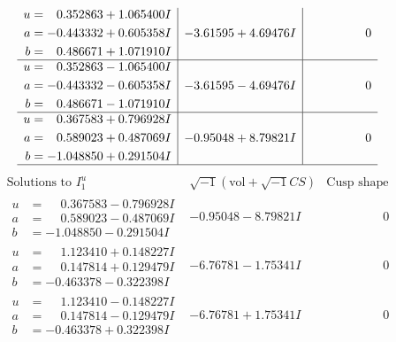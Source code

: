 \documentclass[1p]{elsarticle_modified}
\theoremstyle{definition}
\newcommand{\I}{\sqrt{-1}}
\begin{document}
$$\begin{array}{c|c|c}
\begin{aligned}
u &= \phantom{-}0.352863 + 1.065400 I \\
a &= -0.443332 + 0.605358 I \\
b &= \phantom{-}0.486671 + 1.071910 I\end{aligned}
 & -3.61595 + 4.69476 I & \phantom{-0.000000 } 0 \\ \hline\begin{aligned}
u &= \phantom{-}0.352863 - 1.065400 I \\
a &= -0.443332 - 0.605358 I \\
b &= \phantom{-}0.486671 - 1.071910 I\end{aligned}
 & -3.61595 - 4.69476 I & \phantom{-0.000000 } 0 \\ \hline\begin{aligned}
u &= \phantom{-}0.367583 + 0.796928 I \\
a &= \phantom{-}0.589023 + 0.487069 I \\
b &= -1.048850 + 0.291504 I\end{aligned}
 & -0.95048 + 8.79821 I & \phantom{-0.000000 } 0\\
 \hline 
 \end{array}$$\newpage$$\begin{array}{c|c|c}  
\text{Solutions to }I^u_{1}& \I (\text{vol} + \sqrt{-1}CS) & \text{Cusp shape}\\
 \hline 
\begin{aligned}
u &= \phantom{-}0.367583 - 0.796928 I \\
a &= \phantom{-}0.589023 - 0.487069 I \\
b &= -1.048850 - 0.291504 I\end{aligned}
 & -0.95048 - 8.79821 I & \phantom{-0.000000 } 0 \\ \hline\begin{aligned}
u &= \phantom{-}1.123410 + 0.148227 I \\
a &= \phantom{-}0.147814 + 0.129479 I \\
b &= -0.463378 - 0.322398 I\end{aligned}
 & -6.76781 - 1.75341 I & \phantom{-0.000000 } 0 \\ \hline\begin{aligned}
u &= \phantom{-}1.123410 - 0.148227 I \\
a &= \phantom{-}0.147814 - 0.129479 I \\
b &= -0.463378 + 0.322398 I\end{aligned}
 & -6.76781 + 1.75341 I & \phantom{-0.000000 } 0 \\ \hline\begin{aligned}

\end{aligned}
\end{array}$$
\end{document}
